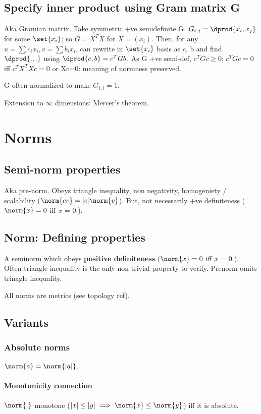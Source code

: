 \documentclass[oneside, article]{memoir}
\begin{document}
\subsection{Specify inner product using Gram matrix G}
Aka Gramian matrix. Take symmetric +ve semidefinite G. $G_{i,j} = \dprod{x_{i}, x_{j}}$ for some $\set{x_{i}}$; so $G = X^{T}X$ for $X = (x_{i})$. Then, for any $u = \sum c_{i}x_{i}, v = \sum b_{i}x_{i}$, can rewrite in $\set{x_{i}}$ basis as $c$, b and find $\dprod{.,.}$ using $\dprod{c,b} = c^{T}Gb$. As G +ve semi-def, $c^{T}Gc \geq 0$; $c^{T}Gc = 0$ iff $c^{T}X^{T}Xc = 0$ or Xc=0: meaning of normness preserved.

G often normalized to make $G_{i,i} = 1$.

Extension to $\infty$ dimensions: Mercer's theorem.

\section{Norms}
\subsection{Semi-norm properties}
Aka pre-norm. Obeys triangle inequality, non negativity, homogeniety / scalability ($\norm{cv} = |c|\norm{v}$). But, not necessarily +ve definiteness ($\norm{x} = 0$ iff $x$ = 0.).

\subsection{Norm: Defining properties}
A seminorm which obeys \textbf{positive definiteness} ($\norm{x} = 0$ iff $x$ = 0.). Often triangle inequality is the only non trivial property to verify. Prenorm omits trinagle inequality.

All norms are metrics (see topology ref).

\subsection{Variants}
\subsubsection{Absolute norms}
$\norm{a} = \norm{|a|}$.

\paragraph*{Monotonicity connection}
$\norm{.}$ monotone ($|x|\leq |y| \implies \norm{x} \leq \norm{y}$) iff it is absolute.
\end{document}
